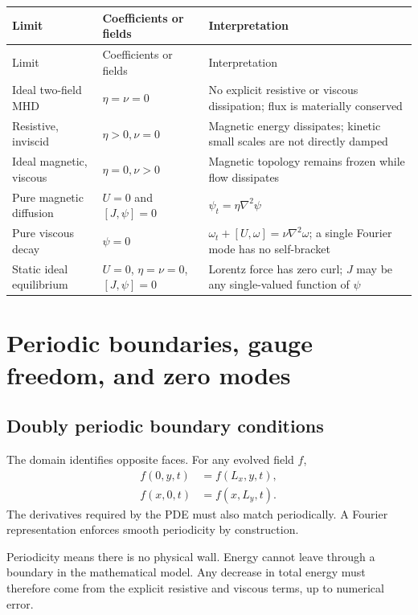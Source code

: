 \documentclass[11pt]{article}
\begin{document}
\begin{longtable}{p{}p{}p{}}
\toprule
Limit & Coefficients or fields & Interpretation \\
\midrule
\endfirsthead
\toprule
Limit & Coefficients or fields & Interpretation \\
\midrule
\endhead
Ideal two-field MHD & $\eta=\nu=0$ & No explicit resistive or viscous dissipation; flux is materially conserved \\
Resistive, inviscid & $\eta>0,\nu=0$ & Magnetic energy dissipates; kinetic small scales are not directly damped \\
Ideal magnetic, viscous & $\eta=0,\nu>0$ & Magnetic topology remains frozen while flow dissipates \\
Pure magnetic diffusion & $U=0$ and $[J,\psi]=0$ & $\psi_t=\eta\nabla^2\psi$ \\
Pure viscous decay & $\psi=0$ & $\omega_t+[U,\omega]=\nu\nabla^2\omega$; a single Fourier mode has no self-bracket \\
Static ideal equilibrium & $U=0$, $\eta=\nu=0$, $[J,\psi]=0$ & Lorentz force has zero curl; $J$ may be any single-valued function of $\psi$ \\
\bottomrule
\end{longtable}

\section{Periodic boundaries, gauge freedom, and zero modes}
\label{sec:boundarygauge}

\subsection{Doubly periodic boundary conditions}

The domain identifies opposite faces. For any evolved field $f$,
\begin{align}
f(0,y,t)&=f(L_x,y,t),\\
f(x,0,t)&=f(x,L_y,t).
\end{align}
The derivatives required by the PDE must also match periodically. A Fourier representation enforces smooth periodicity by construction.

Periodicity means there is no physical wall. Energy cannot leave through a boundary in the mathematical model. Any decrease in total energy must therefore come from the explicit resistive and viscous terms, up to numerical error.
\end{document}
